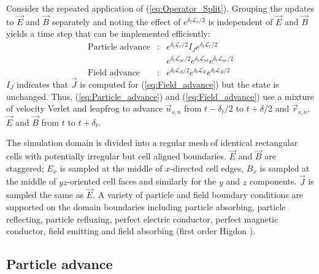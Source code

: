 \documentclass[aps,prl,preprint,preprintnumbers,groupedaddress]{revtex4}
\newcommand{\vecr}{\vec{r}}
\newcommand{\vecu}{\vec{u}}
\newcommand{\vecJ}{\vec{J}}
\newcommand{\vecE}{\vec{E}}
\newcommand{\vecB}{\vec{B}}
\newcommand{\op}{\mathcal{L}}
\newcommand{\eq}[1]{(\ref{eq:#1})}
\begin{document}
Consider the repeated application of \eq{Operator_Split}.  Grouping
the updates to $\vecE$ and $\vecB$ separately and noting the effect of
$e^{\delta_t\op_r/2}$ is independent of $\vecE$ and $\vecB$ yields a
time step that can be implemented efficiently:
\begin{eqnarray}
\text{Particle advance} &:& e^{\delta_t\op_r/2} I_J e^{\delta_t\op_r/2} \nonumber\\
& & e^{\delta_t\op_{ue}/2} e^{\delta_t\op_{ub}} e^{\delta_t\op_{ue}/2}
\label{eq:Particle_advance}\\
\text{Field advance}    &:& e^{\delta_t\op_B/2} e^{\delta_t\op_E} e^{\delta_t\op_B/2} \label{eq:Field_advance}
\end{eqnarray}
$I_J$ indicates that $\vecJ$ is computed for \eq{Field_advance} but
the state is unchanged.  Thus, \eq{Particle_advance} and
\eq{Field_advance} use a mixture of velocity Verlet and leapfrog to
advance $\vecu_{s,n}$ from $t-\delta_t/2$ to $t+\delta/2$ and
$\vecr_{s,n}$, $\vecE$ and $\vecB$ from $t$ to $t+\delta_t$.

The simulation domain is divided into a regular mesh of identical
rectangular cells with potentially irregular but cell aligned
boundaries.  $\vecE$ and $\vecB$ are staggered; $E_x$ is sampled at
the middle of $x$-directed cell edges, $B_x$ is sampled at the middle
of $yz$-oriented cell faces and similarly for the $y$ and $z$
components.  $\vecJ$ is sampled the same as $\vecE$.  A variety of
particle and field boundary conditions are supported on the domain
boundaries including particle absorbing, particle reflecting, particle
refluxing, perfect electric conductor, perfect magnetic conductor,
field emitting and field absorbing (first order Higdon
\cite{Higdon_1986}).

\subsection{Particle advance}
\end{document}
